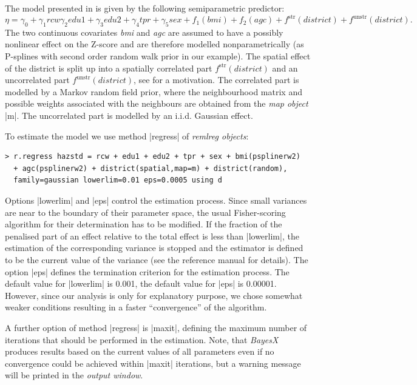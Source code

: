 The model presented in  is given by the following semiparametric predictor:
\[
 \eta=\gamma_0+\gamma_1\mathit{rcw}\gamma_2\mathit{edu1}+\gamma_3\mathit{edu2}+\gamma_4\mathit{tpr}+\gamma_5\mathit{sex}+
 f_1(\mathit{bmi})+f_2(\mathit{agc})+f^{\mathrm{str}}(\mathit{district})+f^{\mathrm{unstr}}(\mathit{district}).
\]
The two continuous covariates {\it bmi} and {\it agc} are assumed to have a possibly nonlinear effect on the Z-score and are
therefore modelled nonparametrically (as P-splines with second order random walk prior in our example). The spatial effect of
the district is split up into a spatially correlated part $f^{\mathrm{str}}(\mathit{district})$ and an uncorrelated part
$f^{\mathrm{unstr}}(\mathit{district})$, see  for a motivation. The correlated part is modelled by a
Markov random field prior, where the neighbourhood matrix and possible weights associated with the neighbours are obtained from
the {\it map object} |m|. The uncorrelated part is modelled by an  i.i.d. Gaussian effect.

To estimate the model we use method |regress| of {\it remlreg objects}:
\begin{verbatim}
> r.regress hazstd = rcw + edu1 + edu2 + tpr + sex + bmi(psplinerw2)
  + agc(psplinerw2) + district(spatial,map=m) + district(random),
  family=gaussian lowerlim=0.01 eps=0.0005 using d
\end{verbatim}

Options |lowerlim| and |eps| control the estimation process. Since small variances are near to the boundary of their parameter
space, the usual Fisher-scoring algorithm for their determination has to be modified. If the fraction of the penalised part of
an effect relative to the total effect is less than |lowerlim|, the estimation of the corresponding variance is stopped and the
estimator is defined to be the current value of the variance (see the  reference manual for details). The option |eps| defines
the termination criterion for the estimation process. The default value for |lowerlim| is 0.001, the default value for |eps| is
0.00001. However, since our analysis is only for explanatory purpose, we chose somewhat weaker conditions resulting in a faster
``convergence'' of the algorithm.

A further option of method |regress| is |maxit|, defining the maximum number of iterations that should be performed in the
estimation. Note, that {\it BayesX} produces results based on the current values of all parameters even if no convergence could
be achieved within |maxit| iterations, but a warning message will be printed in the {\it output window}.

